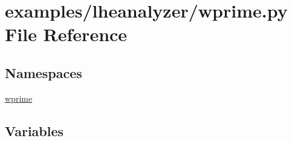 \section{examples/lheanalyzer/wprime.py File Reference}
\label{wprime_8py}
\subsection*{Namespaces}
\begin{DoxyCompactItemize}
\item 
\hyperlink{namespacewprime}{wprime}
\end{DoxyCompactItemize}
\subsection*{Variables}
